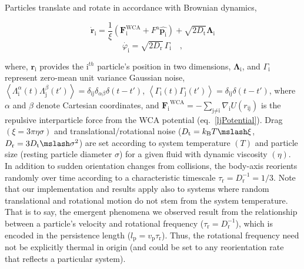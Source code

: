 \documentclass[twoside,twocolumn,9pt]{article}
\begin{document}
Particles translate and rotate in accordance with Brownian dynamics,

\begin{equation}\label{brownmotion}
\dot{\mathbf{r}}_\text{i}= \frac{1}{\xi}\left(\mathbf{F}_\text{i}^\text{WCA} +F^\text{a}\widehat{\mathbf{p}_\text{i}}\right)+ \sqrt{2D_\text{t}}\bm{\Lambda}_\text{i}
\end{equation}
\begin{equation}
\dot{\varphi_\text{i}}=\sqrt{2D_\text{r}}\,\Gamma_\text{i} \quad,
\end{equation}

\noindent where, $\mathbf{r}_\text{i}$ provides the $\text{i}^{th}$ particle's position in two dimensions, ${\bm{\Lambda}}_\text{i}$, and $\Gamma_\text{i}$ represent zero-mean unit variance Gaussian noise, $\left\langle {\Lambda}_\text{i}^{\alpha}(t)  {\Lambda}_\text{j}^{\beta}(t')  \right\rangle = {\delta}_\text{ij} {\delta}_{\alpha \beta} \delta (t-t')$, $\left\langle {\Gamma}_\text{i}(t)  {\Gamma}_\text{j} (t')  \right\rangle = {\delta}_\text{ij} \delta (t-t')$, where $\alpha$ and $\beta$ denote Cartesian coordinates, and ${\mathbf{F}_\text{i}}^\text{WCA} = -\sum_{\text{j}\neq \text{i}}{\nabla}_\text{i} U({r}_\text{ij})$ is the repulsive interparticle force from the WCA potential (eq.~\ref{ljPotential}). Drag $(\xi=3\pi\eta\sigma)$ and translational/rotational noise ($D_\text{t}=k_\text{B}T\mslash \xi$, $D_\text{r}=3D_\text{t}\mslash \sigma^{2}$) are set according to system temperature $(T)$ and particle size (resting particle diameter $\sigma$) for a given fluid with dynamic viscosity $(\eta)$. In addition to sudden orientation changes from collisions, the body-axis reorients randomly over time according to a characteristic timescale $\tau_\text{r}=D_\text{r}^{-1}=1/3$. Note that our implementation and results apply also to systems where random translational and rotational motion do not stem from the system temperature. That is to say, the emergent phenomena we observed result from the relationship between a particle's velocity and rotational frequency ($\tau_\text{r}=D_\text{r}^{-1}$), which is encoded in the persistence length ($l_\text{p}=v_\text{p}\tau_\text{r}$). Thus, the rotational frequency need not be explicitly thermal in origin (and could be set to any reorientation rate that reflects a particular system).
\end{document}
